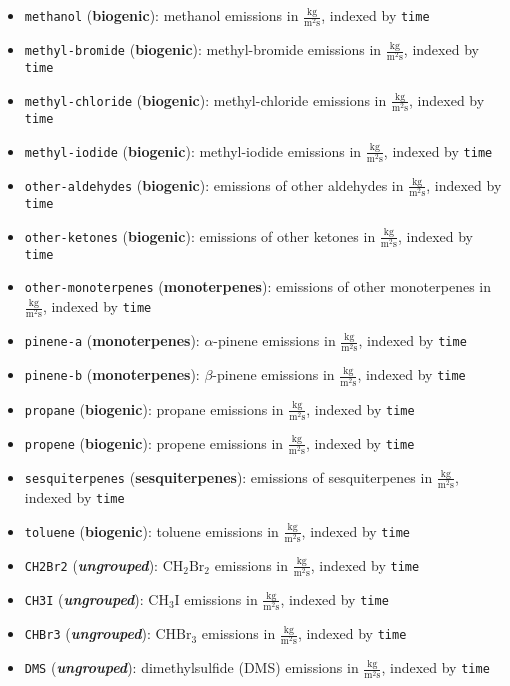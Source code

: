\begin{itemize}
    \item \texttt{methanol} (\textbf{biogenic}): methanol emissions in $\frac{\text{kg}}{\text{m}^2 \text{s}}$, indexed by \texttt{time}
    \item \texttt{methyl-bromide} (\textbf{biogenic}): methyl-bromide emissions in $\frac{\text{kg}}{\text{m}^2 \text{s}}$, indexed by \texttt{time}
    \item \texttt{methyl-chloride} (\textbf{biogenic}): methyl-chloride emissions in $\frac{\text{kg}}{\text{m}^2 \text{s}}$, indexed by \texttt{time}
    \item \texttt{methyl-iodide} (\textbf{biogenic}): methyl-iodide emissions in $\frac{\text{kg}}{\text{m}^2 \text{s}}$, indexed by \texttt{time}
    \item \texttt{other-aldehydes} (\textbf{biogenic}): emissions of other aldehydes in $\frac{\text{kg}}{\text{m}^2 \text{s}}$, indexed by \texttt{time}
    \item \texttt{other-ketones} (\textbf{biogenic}): emissions of other ketones in $\frac{\text{kg}}{\text{m}^2 \text{s}}$, indexed by \texttt{time}
    \item \texttt{other-monoterpenes} (\textbf{monoterpenes}): emissions of other monoterpenes in $\frac{\text{kg}}{\text{m}^2 \text{s}}$, indexed by \texttt{time}
    \item \texttt{pinene-a} (\textbf{monoterpenes}): $\alpha$-pinene emissions in $\frac{\text{kg}}{\text{m}^2 \text{s}}$, indexed by \texttt{time}
    \item \texttt{pinene-b} (\textbf{monoterpenes}): $\beta$-pinene emissions in $\frac{\text{kg}}{\text{m}^2 \text{s}}$, indexed by \texttt{time}
    \item \texttt{propane} (\textbf{biogenic}): propane emissions in $\frac{\text{kg}}{\text{m}^2 \text{s}}$, indexed by \texttt{time}
    \item \texttt{propene} (\textbf{biogenic}): propene emissions in $\frac{\text{kg}}{\text{m}^2 \text{s}}$, indexed by \texttt{time}
    \item \texttt{sesquiterpenes} (\textbf{sesquiterpenes}): emissions of sesquiterpenes in $\frac{\text{kg}}{\text{m}^2 \text{s}}$, indexed by \texttt{time}
    \item \texttt{toluene} (\textbf{biogenic}): toluene emissions in $\frac{\text{kg}}{\text{m}^2 \text{s}}$, indexed by \texttt{time}
    \item \texttt{CH2Br2} (\textit{\textbf{ungrouped}}): $\text{CH}_{2}\text{Br}_{2}$ emissions in $\frac{\text{kg}}{\text{m}^2 \text{s}}$, indexed by \texttt{time}
    \item \texttt{CH3I} (\textit{\textbf{ungrouped}}): $\text{CH}_{3}\text{I}$ emissions in $\frac{\text{kg}}{\text{m}^2 \text{s}}$, indexed by \texttt{time}
    \item \texttt{CHBr3} (\textit{\textbf{ungrouped}}): $\text{CHBr}_{3}$ emissions in $\frac{\text{kg}}{\text{m}^2 \text{s}}$, indexed by \texttt{time}
    \item \texttt{DMS} (\textit{\textbf{ungrouped}}): dimethylsulfide (DMS) emissions in $\frac{\text{kg}}{\text{m}^2 \text{s}}$, indexed by \texttt{time}
\end{itemize}

